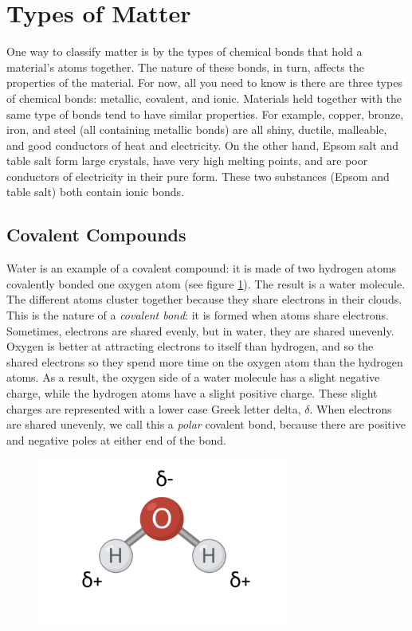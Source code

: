 \section{Types of Matter}
One way to classify matter is by the types of chemical bonds that hold a 
material's atoms together. The nature of these bonds, in turn, affects the 
properties of the material. For now, all you need to know is there are three types
of chemical bonds: metallic, covalent, and ionic. Materials held together with the
same type of bonds tend to have similar properties. For example, copper, bronze, 
iron, and steel (all containing metallic bonds) are all shiny, ductile, malleable,
and good conductors of heat and electricity. On the other hand, Epsom salt and 
table salt form large crystals, have very high melting points, and are poor 
conductors of electricity in their pure form. These two substances (Epsom and 
table salt) both contain ionic bonds. 

\subsection{Covalent Compounds}
Water is an example of a covalent compound: it is made of two hydrogen atoms 
covalently bonded one oxygen atom (see figure \ref{fig:water_polar}). The result 
is a water molecule. The different atoms cluster together 
because they share electrons in their clouds. This is the nature of a 
\textit{covalent bond}: it is formed when atoms share electrons.
Sometimes, electrons are shared evenly, but in water, they are shared unevenly. 
Oxygen is better at attracting electrons to itself than hydrogen, and so the 
shared electrons  so they spend more time on the oxygen atom than the hydrogen 
atoms. As a result, the oxygen side of a water molecule has a slight negative 
charge, while the hydrogen atoms have a slight positive charge. These slight 
charges are represented with a lower case Greek letter delta, $\delta$. When 
electrons are shared unevenly, we call this a \textit{polar} covalent bond, 
because there are positive and negative poles at either end of the bond. 
 

\begin{figure}
\noindent\includegraphics[width=3.25in]{water_polar.png}
\caption{}
\label{fig:water_polar}
\end{figure}

